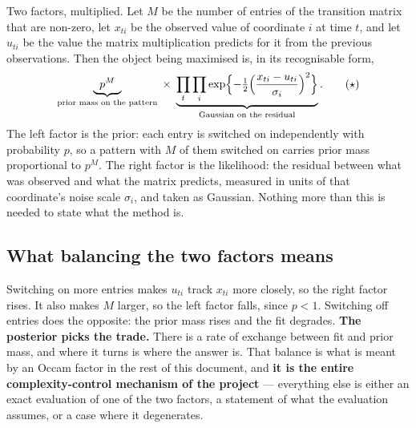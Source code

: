 Two factors, multiplied. Let $M$ be the number of entries of the transition matrix
that are non-zero, let $x_{ti}$ be the observed value of coordinate $i$ at time $t$,
and let $u_{ti}$ be the value the matrix multiplication predicts for it from the
previous observations. Then the object being maximised is, in its recognisable form,
\begin{equation}
\underbrace{\;\;p^{M}\;\;}_{\text{prior mass on the pattern}}
\;\times\;
\underbrace{\prod_{t}\prod_{i}\exp\Bigl\{-\tfrac12\Bigl(\frac{x_{ti}-u_{ti}}{\sigma_i}\Bigr)^{2}\Bigr\}}_{\text{Gaussian on the residual}} .
\tag{$\star$}\label{star}
\end{equation}
The left factor is the prior: each entry is switched on independently with
probability $p$, so a pattern with $M$ of them switched on carries prior mass
proportional to $p^M$. The right factor is the likelihood: the residual between what
was observed and what the matrix predicts, measured in units of that coordinate's
noise scale $\sigma_i$, and taken as Gaussian. Nothing more than this is needed to
state what the method is.

\subsection*{What balancing the two factors means}

Switching on more entries makes $u_{ti}$ track $x_{ti}$ more closely, so the right
factor rises. It also makes $M$ larger, so the left factor falls, since $p<1$.
Switching off entries does the opposite: the prior mass rises and the fit degrades.
\textbf{The posterior picks the trade.} There is a rate of exchange between fit and
prior mass, and where it turns is where the answer is. That balance is what is meant
by an Occam factor in the rest of this document, and \textbf{it is the entire
complexity-control mechanism of the project} --- everything else is either an exact
evaluation of one of the two factors, a statement of what the evaluation assumes, or
a case where it degenerates.

